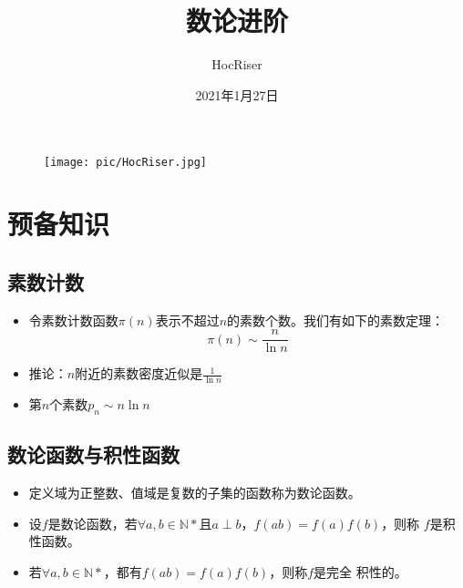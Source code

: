 \documentclass{beamer}
\author{HocRiser}
\title{数论进阶}
\institute{吉林大学 20级唐计}
\date{2021年1月27日}
\begin{document}
\kaishu
\begin{frame}
	\titlepage
	\begin{figure}[htpb]
		\begin{center}
			\texttt{[image: pic/HocRiser.jpg]}
		\end{center}
	\end{figure}
\end{frame}

\begin{frame}
	\tableofcontents[sectionstyle=show,subsectionstyle=show/shaded/hide,subsubsectionstyle=show/shaded/hide]
\end{frame}


\section{预备知识}

\subsection{素数计数}

\begin{frame}
\begin{itemize}[<+-| alert@+>]
	\item 令素数计数函数$\pi(n)$表示不超过$n$的素数个数。我们有如下的素数定理：$$\pi(n) \sim \frac{n}{\ln n}$$
	\item 推论：$n$附近的素数密度近似是$\frac{1}{\ln n}$
	\item 第$n$个素数$p_n \sim n\ln n$
\end{itemize}
\end{frame}

\subsection{数论函数与积性函数}
\begin{frame}
\begin{itemize}[<+-| alert@+>]
	\item 定义域为正整数、值域是复数的子集的函数称为数论函数。
	\item 设$f$是数论函数，若$\forall a,b \in \mathbb{N*}$且$a \perp b$，$f(ab)=f(a)f(b)$，则称 $f$是积性函数。
	\item 若$\forall a,b \in \mathbb{N*}$，都有$f(ab)=f(a)f(b)$，则称$f$是完全
积性的。
\end{itemize}
\end{frame}
\end{document}
